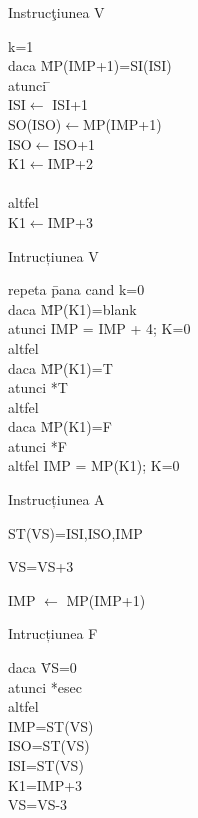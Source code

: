 \documentclass[pdf]{beamer}
\begin{document}
\begin{frame}{Instrucţiunea V}
\begin{tabbing}
		k=1\\
        daca \= MP(IMP+1)=SI(ISI)\\
                 \> atunci \= \+ \\
                      \> ISI$\leftarrow$ ISI+1 \+ \\
                         SO(ISO)$\leftarrow$MP(IMP+1)\\
                    	 ISO$\leftarrow$ISO+1\\
                    	 K1$\leftarrow$IMP+2\\ \- \\
                         altfel \+ \\
                                K1$\leftarrow$IMP+3 \-\- \\
                
\end{tabbing}
\end{frame}



\begin{frame}{Intrucțiunea V}
\begin{tabbing}
repeta \= pana cand k=0\\
	   \> daca \= MP(K1)=blank \+ \\
		       \> atunci IMP = IMP + 4; K=0\\
		  altfel\\
			\> daca \= MP(K1)=T \+ \\
				\> atunci *T\\
				altfel \+ \\
					daca \= MP(K1)=F \+ \\
						atunci *F \-\\
				 altfel IMP = MP(K1); K=0\\
\end{tabbing}
\end{frame}



\begin{frame}{Instrucțiunea A}

ST(VS)=ISI,ISO,IMP

VS=VS+3

IMP $\leftarrow$ MP(IMP+1)\\
\end{frame}



\begin{frame}{Intrucțiunea F}
\begin{tabbing}

daca \= VS=0  \\
     \> atunci *esec \\
altfel \+ \\
       IMP=ST(VS)\\
          ISO=ST(VS)\\
          ISI=ST(VS)\\
          K1=IMP+3\\
          VS=VS-3

\end{tabbing}
\end{frame}
\end{document}
